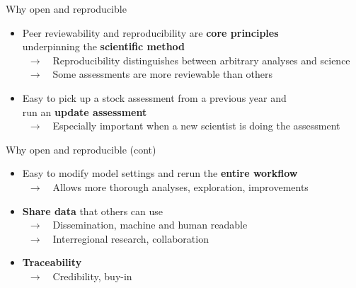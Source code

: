 \documentclass[aspectratio=169]{beamer}
\newcommand\arrow{~$\rightarrow$~~}
\begin{document}

\begin{frame}{Why open and reproducible}
  \begin{itemize}
    \item[] Peer reviewability and reproducibility are {\bf core
      principles}\\[0.2ex]
    underpinning the {\bf scientific method}\\[0.5ex]
    \arrow {\small Reproducibility distinguishes between arbitrary analyses and
      science}\\
    \arrow {\small Some assessments are more reviewable than others}\\[5ex]
    \item[] Easy to pick up a stock assessment from a previous year and\\[0.2ex]
    run an {\bf update assessment}\\[0.5ex]
    \arrow {\small Especially important when a new scientist is doing the
      assessment}\\[4ex]
  \end{itemize}
\end{frame}


\begin{frame}{Why open and reproducible (cont)}
  \begin{itemize}
    \item[] Easy to modify model settings and rerun the {\bf entire
      workflow}\\[0.5ex]
    \arrow {\small Allows more thorough analyses, exploration,
      improvements}\\[5ex]
    \item[] {\bf Share data} that others can use\\[0.5ex]
    \arrow {\small Dissemination, machine and human readable}\\
    \arrow {\small Interregional research, collaboration}\\[5ex]
    \item[] {\bf Traceability}\\[0.5ex]
    \arrow {\small Credibility, buy-in}\\[4ex]
  \end{itemize}
\end{frame}

\end{document}
